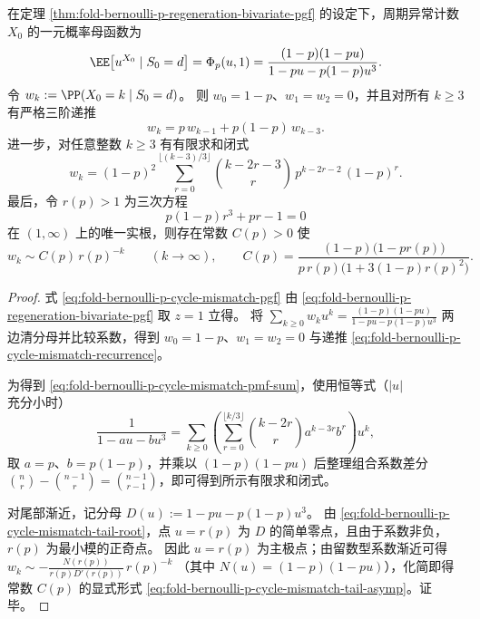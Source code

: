 

\begin{corollary}\label{cor:fold-bernoulli-p-cycle-mismatch-law-tail}
在定理 \ref{thm:fold-bernoulli-p-regeneration-bivariate-pgf} 的设定下，周期异常计数 \(X_0\) 的一元概率母函数为
\begin{equation}\label{eq:fold-bernoulli-p-cycle-mismatch-pgf}
\EE\!\left[u^{X_0}\mid S_0=d\right]
=\Phi_p(u,1)
=\frac{(1-p)(1-pu)}{1-pu-p(1-p)u^3}.
\end{equation}
令 \(w_k:=\PP(X_0=k\mid S_0=d)\)。
则 \(w_0=1-p\)、\(w_1=w_2=0\)，并且对所有 \(k\ge 3\) 有严格三阶递推
\begin{equation}\label{eq:fold-bernoulli-p-cycle-mismatch-recurrence}
w_k=p\,w_{k-1}+p(1-p)\,w_{k-3}.
\end{equation}
进一步，对任意整数 \(k\ge 3\) 有有限求和闭式
\begin{equation}\label{eq:fold-bernoulli-p-cycle-mismatch-pmf-sum}
w_k
=(1-p)^2 \sum_{r=0}^{\lfloor (k-3)/3\rfloor}
\binom{k-2r-3}{r}\,p^{k-2r-2}\,(1-p)^{r}.
\end{equation}
最后，令 \(r(p)>1\) 为三次方程
\begin{equation}\label{eq:fold-bernoulli-p-cycle-mismatch-tail-root}
p(1-p)r^3+pr-1=0
\end{equation}
在 \((1,\infty)\) 上的唯一实根，则存在常数 \(C(p)>0\) 使
\begin{equation}\label{eq:fold-bernoulli-p-cycle-mismatch-tail-asymp}
w_k \sim C(p)\,r(p)^{-k}\qquad(k\to\infty),
\qquad
C(p)=\frac{(1-p)\bigl(1-pr(p)\bigr)}{p\,r(p)\bigl(1+3(1-p)r(p)^2\bigr)}.
\end{equation}
\end{corollary}
\begin{proof}
式 \eqref{eq:fold-bernoulli-p-cycle-mismatch-pgf} 由 \eqref{eq:fold-bernoulli-p-regeneration-bivariate-pgf} 取 \(z=1\) 立得。
将
\(
\sum_{k\ge 0} w_k u^k
=\frac{(1-p)(1-pu)}{1-pu-p(1-p)u^3}
\)
两边清分母并比较系数，得到 \(w_0=1-p\)、\(w_1=w_2=0\) 与递推 \eqref{eq:fold-bernoulli-p-cycle-mismatch-recurrence}。

为得到 \eqref{eq:fold-bernoulli-p-cycle-mismatch-pmf-sum}，使用恒等式（\(|u|\) 充分小时）
\[
\frac{1}{1-au-bu^3}=\sum_{k\ge0}\left(\sum_{r=0}^{\lfloor k/3\rfloor}\binom{k-2r}{r}a^{k-3r}b^r\right)u^k,
\]
取 \(a=p\)、\(b=p(1-p)\)，并乘以 \((1-p)(1-pu)\) 后整理组合系数差分
\(
\binom{n}{r}-\binom{n-1}{r}=\binom{n-1}{r-1}
\)，即可得到所示有限求和闭式。

对尾部渐近，记分母 \(D(u):=1-pu-p(1-p)u^3\)。
由 \eqref{eq:fold-bernoulli-p-cycle-mismatch-tail-root}，点 \(u=r(p)\) 为 \(D\) 的简单零点，且由于系数非负，\(r(p)\) 为最小模的正奇点。
因此 \(u=r(p)\) 为主极点；由留数型系数渐近可得
\(
w_k\sim -\frac{N(r(p))}{r(p)D'(r(p))}\,r(p)^{-k}
\)
（其中 \(N(u)=(1-p)(1-pu)\)），化简即得常数 \(C(p)\) 的显式形式 \eqref{eq:fold-bernoulli-p-cycle-mismatch-tail-asymp}。证毕。
\end{proof}


